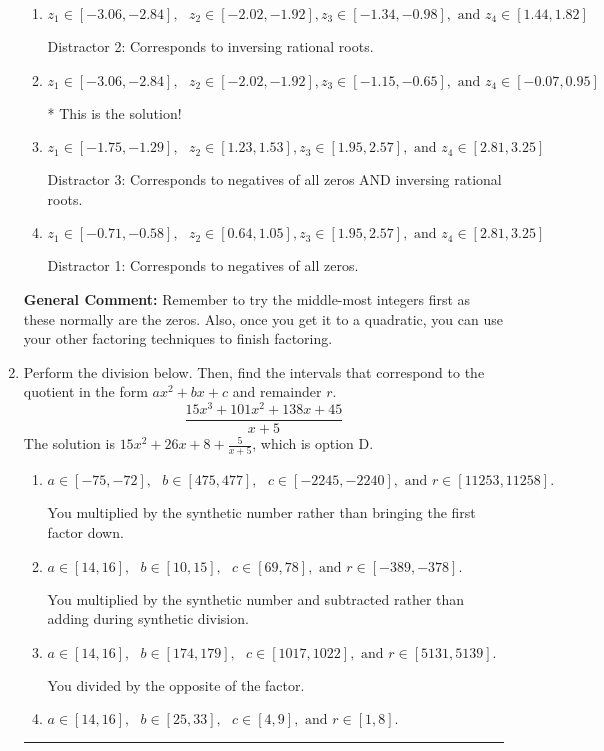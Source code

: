 \documentclass{extbook}[14pt]
\newcommand{\litem}[1]{\item #1

\rule{\textwidth}{0.4pt}}
\begin{document}
\begin{enumerate}
{\begin{enumerate}[label=\Alph*.]
 Distractor 4: Corresponds to moving factors from one rational to another.
\item \( z_1 \in [-3.06, -2.84], \text{   }  z_2 \in [-2.02, -1.92], z_3 \in [-1.34, -0.98], \text{   and   } z_4 \in [1.44, 1.82] \)

 Distractor 2: Corresponds to inversing rational roots.
\item \( z_1 \in [-3.06, -2.84], \text{   }  z_2 \in [-2.02, -1.92], z_3 \in [-1.15, -0.65], \text{   and   } z_4 \in [-0.07, 0.95] \)

* This is the solution!
\item \( z_1 \in [-1.75, -1.29], \text{   }  z_2 \in [1.23, 1.53], z_3 \in [1.95, 2.57], \text{   and   } z_4 \in [2.81, 3.25] \)

 Distractor 3: Corresponds to negatives of all zeros AND inversing rational roots.
\item \( z_1 \in [-0.71, -0.58], \text{   }  z_2 \in [0.64, 1.05], z_3 \in [1.95, 2.57], \text{   and   } z_4 \in [2.81, 3.25] \)

 Distractor 1: Corresponds to negatives of all zeros.
\end{enumerate}

\textbf{General Comment:} Remember to try the middle-most integers first as these normally are the zeros. Also, once you get it to a quadratic, you can use your other factoring techniques to finish factoring.
}
\litem{
Perform the division below. Then, find the intervals that correspond to the quotient in the form $ax^2+bx+c$ and remainder $r$.
\[ \frac{15x^{3} +101 x^{2} +138 x + 45}{x + 5} \]The solution is \( 15x^{2} +26 x + 8 + \frac{5}{x + 5} \), which is option D.\begin{enumerate}[label=\Alph*.]
\item \( a \in [-75, -72], \text{   } b \in [475, 477], \text{   } c \in [-2245, -2240], \text{   and   } r \in [11253, 11258]. \)

 You multiplied by the synthetic number rather than bringing the first factor down.
\item \( a \in [14, 16], \text{   } b \in [10, 15], \text{   } c \in [69, 78], \text{   and   } r \in [-389, -378]. \)

 You multiplied by the synthetic number and subtracted rather than adding during synthetic division.
\item \( a \in [14, 16], \text{   } b \in [174, 179], \text{   } c \in [1017, 1022], \text{   and   } r \in [5131, 5139]. \)

 You divided by the opposite of the factor.
\item \( a \in [14, 16], \text{   } b \in [25, 33], \text{   } c \in [4, 9], \text{   and   } r \in [1, 8]. \)


\end{enumerate}}
\end{enumerate}
\end{document}
